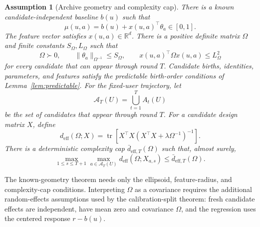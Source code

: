 \documentclass{article} %
\newtheorem{assumption}{Assumption}
\begin{document}
\begin{assumption}[Archive geometry and complexity cap]
\label{assump:shared-structure}
There is a known candidate-independent baseline $b(u)$ such that
\begin{equation}
\label{eq:hyper-linear-model}
\mu(u,a)
=
b(u)+x(u,a)^{\top}\theta_a
\in[0,1].
\end{equation}
The feature vector satisfies $x(u,a)\in\mathbb{R}^d$. There is a positive
definite matrix $\Omega$ and finite constants $S_\Omega,L_\Omega$ such that
\begin{equation}
\label{eq:hyper-pd}
\Omega\succ0,\qquad
\|\theta_a\|_{\Omega^{-1}}\le S_\Omega,\qquad
x(u,a)^\top\Omega x(u,a)\le L_\Omega^2
\end{equation}
for every candidate that can appear through round $T$. Candidate births,
identities, parameters, and features satisfy the predictable birth-order
conditions of Lemma~\ref{lem:predictable}. For the fixed-user trajectory, let
\begin{equation}
\label{eq:hyper-realized-union-main}
\mathcal A_T(U)
=
\bigcup_{t=1}^{T}A_t(U)
\end{equation}
be the set of candidates that appear through round $T$. For a candidate design matrix $X$,
define
\begin{equation}
\label{eq:hyper-deff}
d_{\mathrm{eff}}(\Omega;X)
=
\operatorname{tr}
\!\left[
X^{\top}X
\left(
X^{\top}X+\lambda\Omega^{-1}
\right)^{-1}
\right].
\end{equation}
There is a deterministic complexity cap $\bar d_{\mathrm{eff},T}(\Omega)$ such
that, almost surely,
\begin{equation}
\label{eq:hyper-low-deff}
\max_{1\le s\le T+1}\max_{a\in\mathcal A_T(U)}
d_{\mathrm{eff}}(\Omega;X_{a,s})
\le
\bar d_{\mathrm{eff},T}(\Omega).
\end{equation}
\end{assumption}

The known-geometry theorem needs only the ellipsoid, feature-radius, and
complexity-cap conditions. Interpreting $\Omega$ as a covariance requires the
additional random-effects assumptions used by the calibration-split theorem:
fresh candidate effects are independent, have mean zero and covariance
$\Omega$, and the regression uses the centered response $r-b(u)$.
\end{document}
